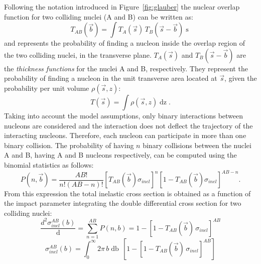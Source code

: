 Following the notation introduced in Figure~\ref{fig:glauber} the nuclear overlap function for two colliding
nuclei (A and B) can be written as:
\begin{equation} \label{eq:overlap}
    T_{AB}(\vec{b}) = \int T_{A}(\vec{s})\,T_{B}(\vec{s}-\vec{b}) \mathop{d^{2}s}
\end{equation}
and represents the probability of finding a nucleon inside the 
overlap region of the two colliding nuclei, in the transverse plane.
$T_{A}(\vec{s})$ and $T_{B}(\vec{s}-\vec{b})$ are the \textit{thickness functions} for the nuclei A and B, respectively.
They represent the probability of finding a nucleon in the unit transverse area located at 
$\vec{s}\xspace$, given the probability per unit volume $\rho(\vec{s},z)$:
\begin{equation} \label{eq:thickfunc}
    T(\vec{s}) = \int \rho(\vec{s},z) \mathop{dz}.
\end{equation}
Taking into account the model assumptions, only binary interactions between nucleons are considered 
and the interaction does not deflect the trajectory of the interacting nucleons.
Therefore, each nucleon can participate in more than one binary collision. 
The probability of having $n$ binary collisions between the nuclei A and B, having A and B nucleons
respectively, can be computed using the binomial statistics as follows:
\begin{equation} \label{eq:ABprob}
    P(n,\vec{b}) = \frac{AB!}{n! (AB-n)!}[T_{AB}(\vec{b})\sigma_{inel}]^{n} [1-T_{AB}(\vec{b})\sigma_{inel}]^{AB-n}.
\end{equation}
From this expression the total inelastic cross section is obtained as a function of the impact
parameter integrating the double differential cross section for two colliding nuclei:
\begin{equation} \label{eq:doublediff}
    \frac{d^{2} \sigma^{AB}_{inel}(b)}{\mathop{db^{2}}} = \sum_{n=1}^{AB} P(n,b)
    = 1 - [1-T_{AB}(\vec{b})\, \sigma_{inel}]^{AB}
\end{equation}
\begin{equation}
    \sigma^{AB}_{inel}(b) = \int_{0}^{\infty} 2 \pi \, b \mathop{db} \,
    [1 - [1-T_{AB}(\vec{b})\, \sigma_{inel}]^{AB}]
\end{equation}


